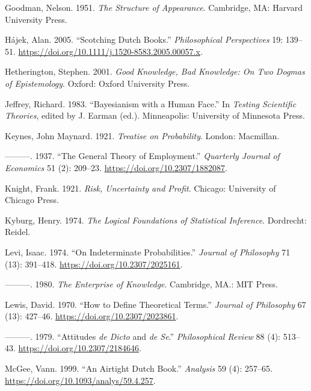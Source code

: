 \documentclass[
  11pt,
  letterpaper,
  DIV=11,
  numbers=noendperiod,
  oneside]{scrartcl}
\newlength{\cslhangindent}
\newenvironment{CSLReferences}[2] %
 {\begin{list}{}{%
  \setlength{\itemindent}{0pt}
  \setlength{\leftmargin}{0pt}
  \setlength{\parsep}{0pt}
  \ifodd #1
   \setlength{\leftmargin}{\cslhangindent}
   \setlength{\itemindent}{-1\cslhangindent}
  \fi
  \setlength{\itemsep}{#2\baselineskip}}}
 {\end{list}}
\begin{document}
\begin{CSLReferences}{1}{0}
Goodman, Nelson. 1951. \emph{The Structure of Appearance}. Cambridge,
MA: Harvard University Press.

Hájek, Alan. 2005. {``Scotching Dutch Books.''} \emph{Philosophical
Perspectives} 19: 139--51.
\url{https://doi.org/10.1111/j.1520-8583.2005.00057.x}.

Hetherington, Stephen. 2001. \emph{Good Knowledge, Bad Knowledge: On Two
Dogmas of Epistemology}. Oxford: Oxford University Press.

Jeffrey, Richard. 1983. {``Bayesianism with a Human Face.''} In
\emph{Testing Scientific Theories}, edited by J. Earman (ed.).
Minneapolis: University of Minnesota Press.

Keynes, John Maynard. 1921. \emph{Treatise on Probability}. London:
Macmillan.

---------. 1937. {``The General Theory of Employment.''} \emph{Quarterly
Journal of Economics} 51 (2): 209--23.
\url{https://doi.org/10.2307/1882087}.

Knight, Frank. 1921. \emph{Risk, Uncertainty and Profit}. Chicago:
University of Chicago Press.

Kyburg, Henry. 1974. \emph{The Logical Foundations of Statistical
Inference}. Dordrecht: Reidel.

Levi, Isaac. 1974. {``On Indeterminate Probabilities.''} \emph{Journal
of Philosophy} 71 (13): 391--418. \url{https://doi.org/10.2307/2025161}.

---------. 1980. \emph{The Enterprise of Knowledge}. Cambridge, MA.: MIT
Press.

Lewis, David. 1970. {``How to Define Theoretical Terms.''} \emph{Journal
of Philosophy} 67 (13): 427--46. \url{https://doi.org/10.2307/2023861}.

---------. 1979. {``Attitudes \emph{de Dicto} and \emph{de Se}.''}
\emph{Philosophical Review} 88 (4): 513--43.
\url{https://doi.org/10.2307/2184646}.

McGee, Vann. 1999. {``An Airtight Dutch Book.''} \emph{Analysis} 59 (4):
257--65. \url{https://doi.org/10.1093/analys/59.4.257}.


\end{CSLReferences}
\end{document}
